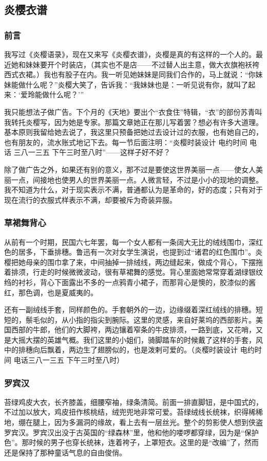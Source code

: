 \subsection{炎樱衣谱}

\subsubsection*{前言}
\par 我写过《炎樱语录》，现在又来写《炎樱衣谱》，炎樱是真的有这样的一个人的。最近她和妹妹要开个时装店，（其实也不是店——不过替人出主意，做大衣旗袍袄袴西式衣裙。）我也有股子在内。我一听见她妹妹是同我们合作的，马上就说：“你妹妹能做什么呢？”炎樱大笑了，告诉我：“我妹妹也是：一听见说有你，就叫了起来：‘爱玲能做什么呢？’”
\par 我只能想法子做广告。下个月的《天地》要出个“衣食住”特辑，“衣”的部份苏青叫我转托炎樱写，因为她是专家。那篇文章她正在那儿写着罢？想必有许多大道理。基本原则我留给她去说了，我这里只预备把她过去设计过的衣服，也有她自己的，也有朋友的，流水账式地记下去。每一节后面注明：“炎樱时装设计 电约时间 电话 三八一三五 下午三时至八时”——这样子好不好？
\par 除了做广告之外，如果还有别的意义，那不过是要使这世界美丽一点——使女人美丽一点，间接地也使男人的世界美丽一点。人微言轻，不过是小小的现地的调整。我不知道为什么，对于现实表示不满，普通都认为是革命的，好的态度；只有对于现在流行的衣服式样表示不满，却要被斥为奇装异服。
\subsubsection*{草裙舞背心}
\par 从前有一个时期，民国六七年罢，每一个女人都有一条阔大无比的绒线围巾，深红色的居多，下垂排穗。鲁迅有一次对女学生演说，也提到过“诸君的红色围巾”。炎樱把她母亲的围巾拿了来，中间抽掉一排绒线，两边缝起来，做成个背心，下摆拖着排须，行走的时候微微波动，很有草裙舞的感觉。背心里面她常常穿着湖绿银纹绉的衬衫，背心下面露出不多的一点鸦青小裙子，而那背心是懊的，胶漆似的酱红，那色调，也是夏威夷的。
\par 还有一副绒线手套，同样颜色的。手套朝外的一边，边缘缀着深红绒线的排穗。短短的，鬃毛似的，从小指的指尖到腕际。这里的灵感，来自好莱坞的西部影片。美国西部的牛郎，他们的大脚袴，两边镶着窄条的牛皮排须，一路到底，又花哨，又是大摇大摆的英雄气概。我们这里的小姐们，骑脚踏车的时候戴了这样的手套，风中的排穗向后飘着，两边生了翅膀似的，也是泼剌可爱的。（炎樱时装设计 电约时间 电话三八一三五 下午三时至八时）
\subsubsection*{罗宾汉}
\par 苔绿鸡皮大衣，长齐膝盖，细腰窄袖，绿条清简。前面一排直脚钮，是中国式的，不过加以放大，鸡皮扭作核桃结，绒兜兜地非常可爱。苔绿绒线长统袜，织得稀稀地，绷在腿上，因为多漏洞的缘故，看上去有一层丝光。整个的剪影使人想到侠盗罗宾汉。罗宾汉出没于古英国的“绿森林”里，他和他的喽啰都穿绿，因为是“保护色”。那时候的男子也穿长统袜，连着袴子，上罩短衣。这里的是“改编”了，然而还是保持了那种童话气息的自由俊俏。
